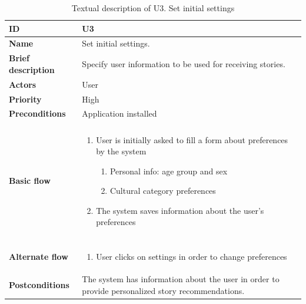 \begin{table}[htp]
	\centering
	\caption{Textual description of U3. Set initial settings}
	\begin{tabular}[b]{|l | p{13cm}|}\hline
		\textbf{ID} 				& U3									\\\hline
		\textbf{Name} 				& Set initial settings.					\\\hline
		\textbf{Brief description}	& Specify user information to be used for receiving stories. \\\hline
		\textbf{Actors} 			& User									\\\hline
		\textbf{Priority}			& High									\\\hline
		\textbf{Preconditions}		& Application installed					\\\hline&\\[-2ex]
		\textbf{Basic flow}			& \begin{minipage}{5in}
			\begin{enumerate}[noitemsep]
				\item User is initially asked to fill a form about preferences by the system
					\begin{enumerate}
						\item Personal info: age group and sex
						\item Cultural category preferences
					\end{enumerate}
				\item The system saves information about the user’s preferences
			\end{enumerate}						
		\end{minipage}						\\\hline&\\[-2ex]
		\textbf{Alternate flow}		& \begin{minipage}{5in}
			\begin{enumerate}[noitemsep]
				\item User clicks on settings in order to change preferences
			\end{enumerate}
		\end{minipage}							\\\hline
		\textbf{Postconditions}		& The system has information about the user in order to provide personalized story recommendations.\\\hline
	\end{tabular}
	\label{Tab:U3}
\end{table}

